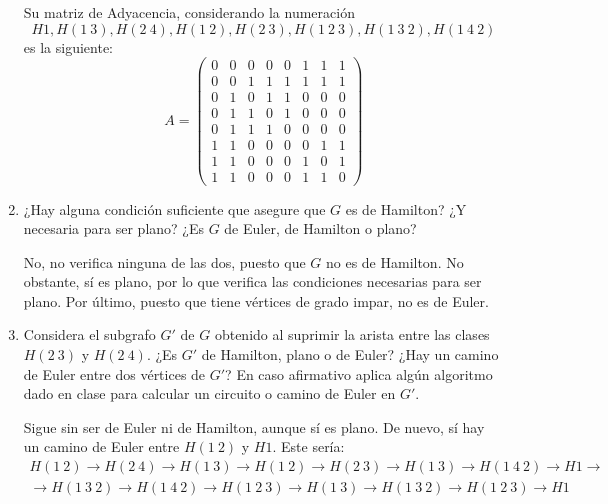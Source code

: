 \begin{ejercicio}
\begin{enumerate}
        Su matriz de Adyacencia, considerando la numeración
        $$H1, H(1\ 3), H(2\ 4), H(1\ 2), H(2\ 3), H(1\ 2\ 3), H(1\ 3\ 2), H(1\ 4\ 2)$$ es la siguiente:
        \[
            A=\begin{pmatrix}
                0 & 0 & 0 & 0 & 0 & 1 & 1 & 1 \\
                0 & 0 & 1 & 1 & 1 & 1 & 1 & 1 \\
                0 & 1 & 0 & 1 & 1 & 0 & 0 & 0 \\
                0 & 1 & 1 & 0 & 1 & 0 & 0 & 0 \\
                0 & 1 & 1 & 1 & 0 & 0 & 0 & 0 \\
                1 & 1 & 0 & 0 & 0 & 0 & 1 & 1 \\
                1 & 1 & 0 & 0 & 0 & 1 & 0 & 1 \\
                1 & 1 & 0 & 0 & 0 & 1 & 1 & 0
            \end{pmatrix}
        \]


        \item ¿Hay alguna condición suficiente que asegure que $G$ es de Hamilton? ¿Y necesaria para ser plano? ¿Es $G$ de Euler, de Hamilton o plano?
        
        No, no verifica ninguna de las dos, puesto que $G$ no es de Hamilton. No obstante, sí es plano, por lo que verifica las condiciones necesarias para ser plano. Por último, puesto que tiene vértices de grado impar, no es de Euler.
        \item Considera el subgrafo $G'$ de $G$ obtenido al suprimir la arista entre las clases $H(2\ 3)$ y $H(2\ 4)$. ¿Es $G'$ de Hamilton, plano o de Euler? ¿Hay un camino de Euler entre dos vértices de $G'$? En caso afirmativo aplica algún algoritmo dado en clase para calcular un circuito o camino de Euler en $G'$.
        
        Sigue sin ser de Euler ni de Hamilton, aunque sí es plano. De nuevo, sí hay un camino de Euler entre $H(1\ 2)$ y $H1$. Este sería:
        \begin{multline*}
            H(1\ 2)\to H(2\ 4)\to H(1\ 3)\to H(1\ 2)\to H(2\ 3)\to H(1\ 3)\to H(1\ 4\ 2)\to H1\to\\
            \to H(1\ 3\ 2)\to H(1\ 4\ 2)\to H(1\ 2\ 3)\to H(1\ 3)\to H(1\ 3\ 2)\to H(1\ 2\ 3)\to H1
        \end{multline*}
    \end{enumerate}
\end{ejercicio}
